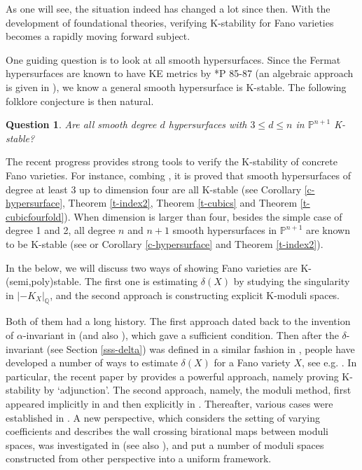 \documentclass[12pt,reqno]{amsart}%
\newtheorem*{ques*}{Question}
\theoremstyle{definition}
\theoremstyle{remark}
\begin{document}
\medskip

As one will see, the situation indeed has changed a lot since then. With the development of foundational theories, verifying K-stability for Fano varieties becomes a rapidly moving forward subject. 

One guiding question is to look at all smooth hypersurfaces. Since the Fermat hypersurfaces are known to have KE metrics by \cite{Tia00}*{P 85-87} (an algebraic approach is given in \cite{Zhu20}), we know a general smooth hypersurface is K-stable. 
The following folklore conjecture is then natural.
\begin{ques*}
 Are all smooth degree $d$ hypersurfaces with $3\le d \le n$ in $\mathbb{P}^{n+1}$ K-stable? 
\end{ques*}

The recent progress provides  strong tools to verify the K-stability of concrete Fano varieties. For instance, combing \cite{Fuj19, LX19,  AZ20, Liu20}, it is proved that smooth hypersurfaces of degree at least 3 up to dimension four are all K-stable (see Corollary \ref{c-hypersurface}, Theorem \ref{t-index2}, Theorem \ref{t-cubics} and Theorem \ref{t-cubicfourfold}). When dimension is larger than four, besides the simple case of degree 1 and 2,  all degree $n$ and $n+1$ smooth hypersurfaces in $\mathbb{P}^{n+1}$ are known to be K-stable (see \cite{Fuj19, SZ19} or Corollary \ref{c-hypersurface} and Theorem \ref{t-index2}). %

\medskip

In the below, we will discuss two ways of showing Fano varieties are K-(semi,poly)stable. The first one is estimating $\delta(X)$ by studying the singularity in $|-K_X|_{\mathbb{Q}}$, and the second approach is constructing explicit K-moduli spaces. 

Both of them had a long history. The first approach dated back to the invention of $\alpha$-invariant in \cite{Tia87} (and also \cite{OS12}), which gave a sufficient condition. Then after the $\delta$-invariant (see Section \ref{sss-delta}) was defined in a similar fashion in \cite{FO18}, people have developed a number of ways to estimate $\delta(X)$ for a Fano variety $X$, see e.g. \cite{Fuj19, SZ19, AZ20}. In particular, the recent paper by \cite{AZ20} provides a powerful approach, namely proving K-stability by `adjunction'.  The second approach, namely, the moduli method, first appeared implicitly in \cite{Tia90} and then explicitly in \cite{MM93}.
Thereafter, various cases were established in \cite{OSS16, SS17, LX19, Liu20}. A new perspective, which considers the setting of varying coefficients and describes the wall crossing birational maps between moduli spaces, was investigated in \cite{ADL19, ADL20} (see also \cite{GMS18}), and put a number of moduli spaces constructed from other perspective into a uniform framework.
\end{document}
